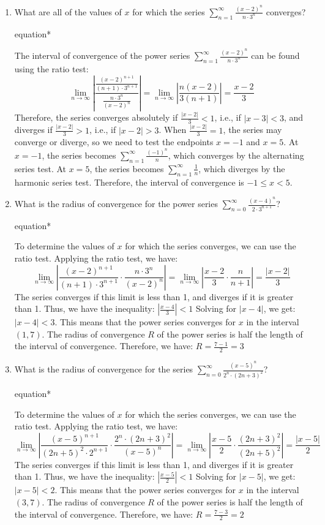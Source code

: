 \documentclass[12pt]{article}
\begin{document}
\begin{enumerate}
	\item What are all of the values of $x$ for which the series $\sum_{n=1}^{\infty} \frac{(x-2)^n}{n\cdot 3^n}$ converges?
	      \begin{empheq}[box=\tcbhighmath]{equation*}
	      	\parbox{6in}{The interval of convergence of the power series $\sum_{n=1}^{\infty} \frac{(x-2)^n}{n\cdot 3^n}$ can be found using the ratio test: $$\lim_{n\to\infty} \left| \frac{\frac{(x-2)^{n+1}}{(n+1) \cdot 3^{n+1}}}{\frac{n \cdot 3^n}{(x-2)^n}} \right| = \lim_{n\to\infty} \left| \frac{n(x-2)}{3(n+1)}\right| = \frac{x-2}{3}$$ Therefore, the series converges absolutely if $\frac{|x-2|}{3} < 1$, i.e., if $|x-3| < 3$, and diverges if $\frac{|x-2|}{3} > 1$, i.e., if $|x-2| > 3$. When $\frac{|x-2|}{3} = 1$, the series may converge or diverge, so we need to test the endpoints $x=-1$ and $x=5$. At $x=-1$, the series becomes $\sum_{n=1}^{\infty} \frac{(-1)^n}{n}$, which converges by the alternating series test. At $x=5$, the series becomes $\sum_{n=1}^{\infty} \frac{1}{n}$, which diverges by the harmonic series test. Therefore, the interval of convergence is $\boxed{-1 \leq x < 5}$.}
	      \end{empheq}
	\item What is the radius of convergence for the power series $\sum_{n=0}^{\infty} \frac{(x-4)^n}{2 \cdot 3^{n+1}}$?
	      \begin{empheq}[box=\tcbhighmath]{equation*}
	      	\parbox{6in}{To determine the values of $x$ for which the series converges, we can use the ratio test. Applying the ratio test, we have: $$\lim_{n \to \infty} \left| \frac{(x-2)^{n+1}}{(n+1)\cdot 3^{n+1}} \cdot \frac{n \cdot 3^n}{(x-2)^n} \right| = \lim_{n \to \infty} \left| \frac{x-2}{3} \cdot \frac{n}{n+1} \right| = \frac{|x-2|}{3}$$ The series converges if this limit is less than 1, and diverges if it is greater than 1. Thus, we have the inequality: $|\frac{x-4}{3}| < 1$ Solving for $|x-4|$, we get: $|x-4| < 3$. This means that the power series converges for $x$ in the interval $(1, 7)$. The radius of convergence $R$ of the power series is half the length of the interval of convergence. Therefore, we have: $\boxed{R = \frac{7-1}{2} = 3}$}
	      \end{empheq}
	\item What is the radius of convergence for the series $\sum_{n=0}^{\infty} \frac{(x-5)^n}{2^n \cdot (2n+3)^2}$?
	      \begin{empheq}[box=\tcbhighmath]{equation*}
	      	\parbox{6in}{To determine the values of $x$ for which the series converges, we can use the ratio test. Applying the ratio test, we have: $$\lim_{n \to \infty} \left| \frac{(x-5)^{n+1}}{(2n+5)^2\cdot 2^{n+1}} \cdot \frac{2^n \cdot (2n+3)^2}{(x-5)^n} \right| = \lim_{n \to \infty} \left| \frac{x-5}{2} \cdot \frac{(2n+3)^2}{(2n+5)^2} \right| = \frac{|x-5|}{2}$$ The series converges if this limit is less than 1, and diverges if it is greater than 1. Thus, we have the inequality: $|\frac{x-5}{2}| < 1$ Solving for $|x-5|$, we get: $|x-5| < 2$. This means that the power series converges for $x$ in the interval $(3, 7)$. The radius of convergence $R$ of the power series is half the length of the interval of convergence. Therefore, we have: $\boxed{R = \frac{7-3}{2} = 2}$}

\end{empheq}
\end{enumerate}
\end{document}
